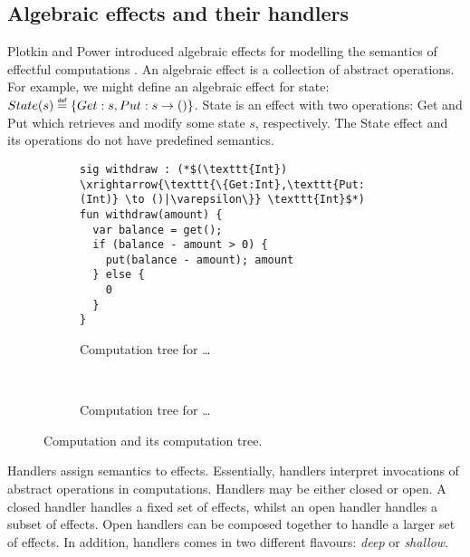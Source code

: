 \documentclass[preprint,10pt,numbers]{sigplanconf}
\newcommand{\defas}[0]{\mathrel{\overset{\makebox[0pt]{\mbox{\normalfont\tiny\sffamily def}}}{=}}} %
\begin{document}
\subsection{Algebraic effects and their handlers}\label{sec:effects-and-handlers}
Plotkin and Power introduced algebraic effects \cite{Plotkin2001} for modelling the semantics of effectful computations \cite{Lindley2014}. An algebraic effect is a collection of abstract operations. For example, we might define an algebraic effect for state: $State(s) \defas \{Get:s,Put:s \to ()\}$. State is an effect with two operations: Get and Put which retrieves and modify some state $s$, respectively. The State effect and its operations do not have predefined semantics.

\begin{figure*}[t!]
\begin{subfigure}[b]{0.5\textwidth}
\centering
\begin{lstlisting}[caption={},style=links]
sig withdraw : (*$(\texttt{Int}) \xrightarrow{\texttt{\{Get:Int},\texttt{Put:(Int)} \to ()|\varepsilon\}} \texttt{Int}$*)
fun withdraw(amount) {
  var balance = get();
  if (balance - amount > 0) {
    put(balance - amount); amount
  } else {
    0
  }
}
\end{lstlisting}
\caption{Computation tree for \dots}\label{fig:effecttree}
\end{subfigure}
~
\begin{subfigure}[b]{0.5\textwidth}
\centering
{}
\caption{Computation tree for \dots}\label{fig:effecttree}
\end{subfigure}
\caption{Computation and its computation tree.}
\end{figure*}

Handlers assign semantics to effects. Essentially, handlers interpret invocations of abstract operations in computations. Handlers may be either closed or open. A closed handler handles a fixed set of effects, whilst an open handler handles a subset of effects. Open handlers can be composed together to handle a larger set of effects. In addition, handlers comes in two different flavours: \emph{deep} or \emph{shallow}.
\end{document}
